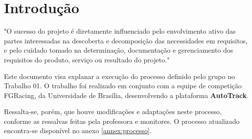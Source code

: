 \chapter*[Introdução]{Introdução}

"O sucesso do projeto é diretamente influenciado pelo envolvimento ativo das partes interessadas na
descoberta e decomposição das necessidades em requisitos, e pelo cuidado tomado na determinação,
documentação e gerenciamento dos requisitos do produto, serviço ou resultado do projeto." \cite{pmbok}

Este documento visa explanar a execução do processo definido pelo grupo no Trabalho 01. O trabalho foi realizado
em conjunto com a equipe de competição FGRacing, da Universidade de Brasília, desenvolvendo a plataforma \textbf{AutoTrack}.

Ressalta-se, porém, que houve modificações e adaptações neste processo, conforme as ressalvas feitas pela professora e monitores.
O processo atualizado encontra-se disponível no anexo \ref{annex:processo}.

